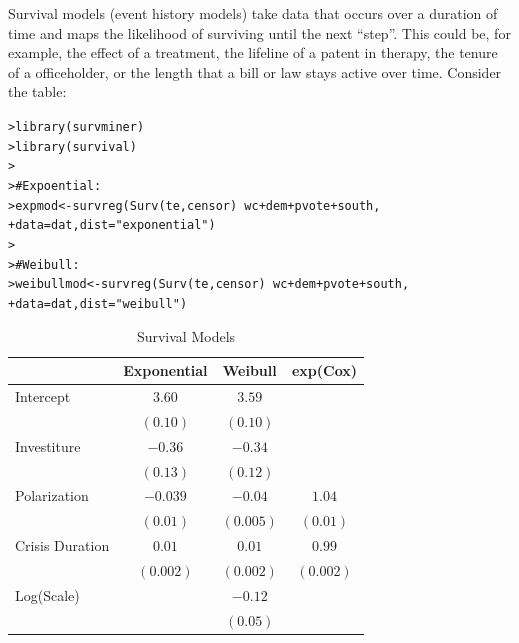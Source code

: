 \documentclass[12pt]{article}\usepackage[]{graphicx}\usepackage[]{color}
\makeatletter
\newcommand{\hlstr}[1]{\textcolor[rgb]{0.82,0.78,0.62}{#1}}%
\newcommand{\hlcom}[1]{\textcolor[rgb]{0.404,0.408,0.42}{#1}}%
\newcommand{\hlopt}[1]{\textcolor[rgb]{0.882,0.878,0.898}{#1}}%
\newcommand{\hlstd}[1]{\textcolor[rgb]{0.882,0.878,0.898}{#1}}%
\newcommand{\hlkwb}[1]{\textcolor[rgb]{0.902,0.675,0.196}{#1}}%
\newcommand{\hlkwc}[1]{\textcolor[rgb]{0.812,0.522,0.388}{#1}}%
\newcommand{\hlkwd}[1]{\textcolor[rgb]{0.733,0.388,0.812}{#1}}%
\newenvironment{kframe}{%
 \def\at@end@of@kframe{}%
 \ifinner\ifhmode%
  \def\at@end@of@kframe{\end{minipage}}%
  \begin{minipage}{\columnwidth}%
 \fi\fi%
 \def\FrameCommand##1{\hskip\@totalleftmargin \hskip-\fboxsep
 \colorbox{shadecolor}{##1}\hskip-\fboxsep
     \hskip-\linewidth \hskip-\@totalleftmargin \hskip\columnwidth}%
 \MakeFramed {\advance\hsize-\width
   \@totalleftmargin\z@ \linewidth\hsize
   \@setminipage}}%
 {\par\unskip\endMakeFramed%
 \at@end@of@kframe}
\newenvironment{knitrout}{}{} %
\makeatother
\begin{document}
\begin{flushleft}
Survival models (event history models) take data that occurs over a duration of time and maps the likelihood of surviving until the next ``step''. This could be, for example, the effect of a treatment, the lifeline of a patent in therapy, the tenure of a officeholder, or the length that a bill or law stays active over time. Consider the table:

\begin{knitrout}
\color{fgcolor}\begin{kframe}
\begin{alltt}
\hlstd{> }\hlkwd{library}\hlstd{(survminer)}
\hlstd{> }\hlkwd{library}\hlstd{(survival)}
\hlstd{> }
\hlstd{> }\hlcom{# Expoential:}
\hlstd{> }\hlstd{expmod} \hlkwb{<-} \hlkwd{survreg}\hlstd{(}\hlkwd{Surv}\hlstd{(te, censor)} \hlopt{~} \hlstd{wc} \hlopt{+} \hlstd{dem} \hlopt{+} \hlstd{pvote} \hlopt{+} \hlstd{south,}
\hlstd{+ }                  \hlkwc{data} \hlstd{= dat,} \hlkwc{dist} \hlstd{=} \hlstr{"exponential"}\hlstd{)}
\hlstd{> }
\hlstd{> }\hlcom{# Weibull:}
\hlstd{> }\hlstd{weibullmod} \hlkwb{<-} \hlkwd{survreg}\hlstd{(}\hlkwd{Surv}\hlstd{(te, censor)} \hlopt{~} \hlstd{wc} \hlopt{+} \hlstd{dem} \hlopt{+} \hlstd{pvote} \hlopt{+} \hlstd{south,}
\hlstd{+ }                  \hlkwc{data} \hlstd{= dat,} \hlkwc{dist} \hlstd{=} \hlstr{"weibull"}\hlstd{)}
\end{alltt}
\end{kframe}
\end{knitrout}



\begin{table}[h!]
\caption{Survival Models}
\begin{center}
\begin{tabular}{l c c c }
\hline
 & Exponential & Weibull & exp(Cox) \\
\hline
Intercept          & $3.60$    & $3.59$    &           \\
                   & $(0.10)$  & $(0.10)$  &           \\
Investiture        & $-0.36$   & $-0.34$   &           \\
                   & $(0.13)$  & $(0.12)$  &           \\
Polarization       & $-0.039$  & $-0.04$   & $1.04$    \\
                   & $(0.01)$  & $(0.005)$ & $(0.01)$  \\
Crisis Duration    & $0.01$    & $0.01$    & $0.99$    \\
                   & $(0.002)$ & $(0.002)$ & $(0.002)$ \\
Log(Scale)         &           & $-0.12$   &           \\
                   &           & $(0.05)$  &           \\


\end{tabular}
\end{center}
\end{table}
\end{flushleft}
\end{document}
